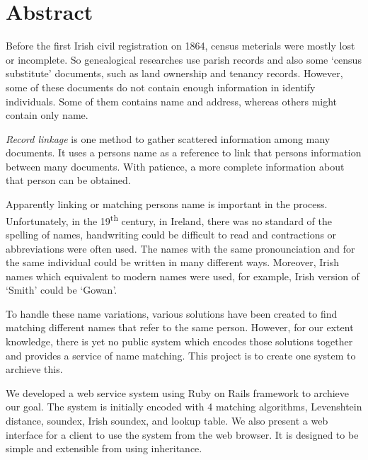 

\begingroup
\let\clearpage\relax
\let\cleardoublepage\relax
\let\cleardoublepage\relax

\chapter*{Abstract}

Before the first Irish civil registration on 1864, census meterials
were mostly lost or incomplete. So genealogical researches use
parish records and also some `census substitute' documents,
such as land ownership and tenancy records. However, some of these documents
do not contain enough information in identify individuals.
Some of them contains name and address, whereas others might contain only name.

\emph{Record linkage} is one method to gather scattered information among many documents.
It uses a person\textquotesingle s name as a reference to link that
person\textquotesingle s information between many documents. With patience,
a more complete information about that person can be obtained.

Apparently linking or matching person\textquotesingle s name is important in the process.
Unfortunately, in the 19\textsuperscript{th} century, in Ireland, there was no standard
of the spelling of names, handwriting could be difficult to read
and contractions or abbreviations were often used. The names with the same
pronounciation and for the same individual could be written in many different ways.
Moreover, Irish names which equivalent to modern names
were used, for example, Irish version of `Smith' could be `Gowan'.

To handle these name variations, various solutions have been created to find
matching different names that refer to the same person. However,
for our extent knowledge, there is yet no public system which encodes
those solutions together and provides a service of name matching.
This project is to create one system to archieve this.

We developed a web service system using Ruby on Rails framework
to archieve our goal. The system is initially encoded with 4 matching algorithms,
Levenshtein distance, soundex, Irish soundex, and lookup table.
We also present a web interface for a client to use the system
from the web browser. It is designed to be simple and extensible from using
inheritance.

\endgroup
\vfill
